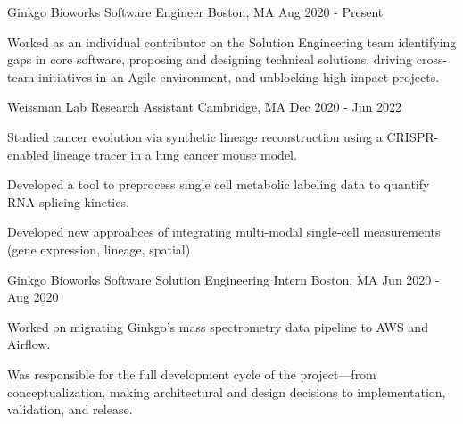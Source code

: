 

\begin{cventries}

\cventry
  {Ginkgo Bioworks} %
  {Software Engineer} %
  {Boston, MA} %
  {Aug 2020 - Present} %
  {
    \begin{cvitems} %
      \item {Worked as an individual contributor on the Solution Engineering team identifying gaps in core software, proposing and designing technical solutions, driving cross-team initiatives in an Agile environment, and unblocking high-impact projects.}
    \end{cvitems}
  }

\cventry
  {Weissman Lab} %
  {Research Assistant} %
  {Cambridge, MA} %
  {Dec 2020 - Jun 2022} %
  {
    \begin{cvitems} %
      \item {Studied cancer evolution via synthetic lineage reconstruction using a CRISPR-enabled lineage tracer in a lung cancer mouse model.}
      \item {Developed a tool to preprocess single cell metabolic labeling data to quantify RNA splicing kinetics.}
      \item {Developed new approahces of integrating multi-modal single-cell measurements (gene expression, lineage, spatial)}
    \end{cvitems}
  }

  \cventry
    {Ginkgo Bioworks} %
    {Software Solution Engineering Intern} %
    {Boston, MA} %
    {Jun 2020 - Aug 2020} %
    {
      \begin{cvitems} %
        \item {Worked on migrating Ginkgo's mass spectrometry data pipeline to AWS and Airflow.}
        \item {Was responsible for the full development cycle of the project---from conceptualization, making architectural and design decisions to implementation, validation, and release.}
      \end{cvitems}
    }


\end{cventries}
